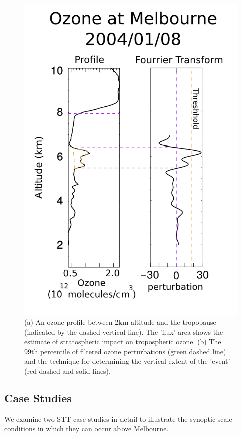     \begin{figure}[!htbp]
      \includegraphics[width=\columnwidth]{Figures/Ozone/filtereg.png}
      \caption{ (a) An ozone profile between 2km altitude and the tropopause (indicated by the dashed vertical line).
      The 'flux' area shows the estimate of stratospheric impact on tropospheric ozone.
      (b) The 99th percentile of filtered ozone perturbations (green dashed line) and the technique for determining the vertical extent of the 'event' (red dashed and solid lines).%
      }
      \label{ch_o3:fig:filterEG}
    \end{figure}
    
  \subsection{Case Studies}
    We examine two STT case studies in detail to illustrate the synoptic scale conditions in which they can occur above Melbourne.

